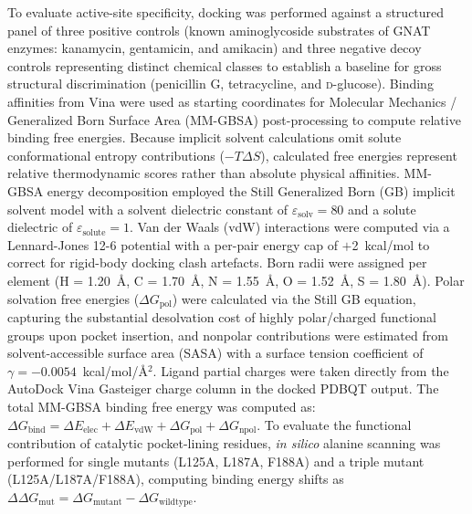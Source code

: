 \documentclass[pdflatex,sn-mathphys-num]{sn-jnl}
\begin{document}
To evaluate active-site specificity, docking was performed against a structured panel of three positive controls (known aminoglycoside substrates of GNAT enzymes: kanamycin, gentamicin, and amikacin) and three negative decoy controls representing distinct chemical classes to establish a baseline for gross structural discrimination (penicillin G, tetracycline, and \textsc{d}-glucose). Binding affinities from Vina were used as starting coordinates for Molecular Mechanics / Generalized Born Surface Area (MM-GBSA) post-processing to compute relative binding free energies. Because implicit solvent calculations omit solute conformational entropy contributions ($-T\Delta S$), calculated free energies represent relative thermodynamic scores rather than absolute physical affinities. MM-GBSA energy decomposition employed the Still Generalized Born (GB) implicit solvent model with a solvent dielectric constant of $\varepsilon_{\text{solv}} = 80$ and a solute dielectric of $\varepsilon_{\text{solute}} = 1$. Van der Waals (vdW) interactions were computed via a Lennard-Jones 12-6 potential with a per-pair energy cap of $+$2~kcal/mol to correct for rigid-body docking clash artefacts. Born radii were assigned per element (H = 1.20~\AA, C = 1.70~\AA, N = 1.55~\AA, O = 1.52~\AA, S = 1.80~\AA). Polar solvation free energies ($\Delta G_{\text{pol}}$) were calculated via the Still GB equation, capturing the substantial desolvation cost of highly polar/charged functional groups upon pocket insertion, and nonpolar contributions were estimated from solvent-accessible surface area (SASA) with a surface tension coefficient of $\gamma = {-}0.0054$~kcal/mol/\AA$^2$. Ligand partial charges were taken directly from the AutoDock Vina Gasteiger charge column in the docked PDBQT output. The total MM-GBSA binding free energy was computed as: $\Delta G_{\text{bind}} = \Delta E_{\text{elec}} + \Delta E_{\text{vdW}} + \Delta G_{\text{pol}} + \Delta G_{\text{npol}}$. To evaluate the functional contribution of catalytic pocket-lining residues, \textit{in silico} alanine scanning was performed for single mutants (L125A, L187A, F188A) and a triple mutant (L125A/L187A/F188A), computing binding energy shifts as $\Delta\Delta G_{\text{mut}} = \Delta G_{\text{mutant}} - \Delta G_{\text{wildtype}}$.
\end{document}
